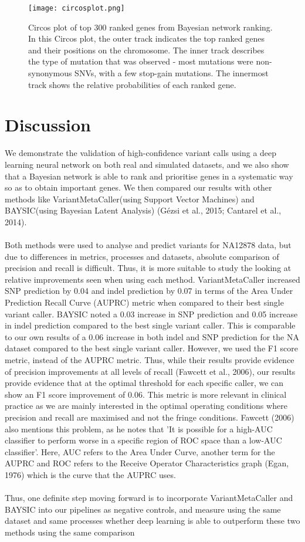\documentclass{article}
\begin{document}
\begin{figure}[H]
\texttt{[image: circosplot.png]}
\caption{Circos plot of top 300 ranked genes from Bayesian network ranking. In this Circos plot, the outer track indicates the top ranked genes and their positions on the chromosome. The inner track describes the type of mutation that was observed - most mutations were non-synonymous SNVs, with a few stop-gain mutations. The innermost track shows the relative probabilities of each ranked gene.}
\centering
\end{figure}

\newpage
\section{Discussion}
We demonstrate the validation of high-confidence variant calls using a deep learning neural network on both real and simulated datasets, and we also show that a Bayesian network is able to rank and prioritise genes in a systematic way so as to obtain important genes. We then compared our results with other methods like VariantMetaCaller(using Support Vector Machines) and BAYSIC(using Bayesian Latent Analysis) (Gézsi et al., 2015; Cantarel et al., 2014). \\\\Both methods were used to analyse and predict variants for NA12878 data, but due to differences in metrics, processes and datasets, absolute comparison of precision and recall is difficult. Thus, it is more suitable to study the looking at relative improvements seen when using each method. VariantMetaCaller increased SNP prediction by 0.04 and indel prediction by 0.07 in terms of the Area Under Prediction Recall Curve (AUPRC) metric when compared to their best single variant caller. BAYSIC noted a 0.03 increase in SNP prediction and 0.05 increase in indel prediction compared to the best single variant caller. This is comparable to our own results of a 0.06 increase in both indel and SNP prediction for the NA dataset compared to the best single variant caller. However, we used the F1 score metric, instead of the AUPRC metric. Thus, while their results provide evidence of precision improvements at all levels of recall (Fawcett et al., 2006), our results provide evidence that at the optimal threshold for each specific caller, we can show an F1 score improvement of 0.06. This metric is more relevant in clinical practice as we are mainly interested in the optimal operating conditions where precision and recall are maximised and not the fringe conditions. Fawcett (2006) also mentions this problem, as he notes that 'It is possible for a high-AUC classifier to perform worse in a specific region of ROC space than a low-AUC classifier'. Here, AUC refers to the Area Under Curve, another term for the AUPRC and ROC refers to the Receive Operator Characteristics graph (Egan, 1976) which is the curve that the AUPRC uses. \\\\ Thus, one definite step moving forward is to incorporate VariantMetaCaller and BAYSIC into our pipelines as negative controls, and measure using the same dataset and same processes whether deep learning is able to outperform these two methods using the same comparison 
\end{document}
